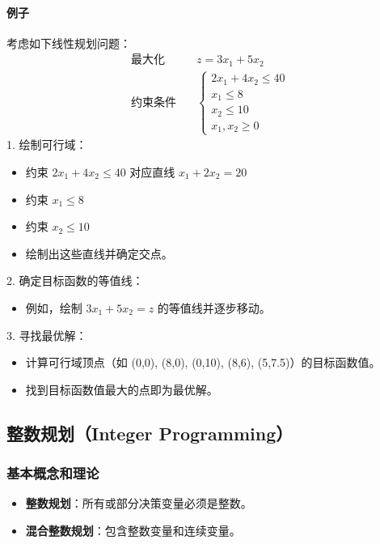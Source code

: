 \documentclass[UTF8]{ctexart}
\begin{document}
\paragraph{例子}
考虑如下线性规划问题：
\[
\begin{aligned}
\text{最大化} & \quad z = 3x_1 + 5x_2 \\
\text{约束条件} & \quad 
\begin{cases}
2x_1 + 4x_2 \leq 40 \\
x_1 \leq 8 \\
x_2 \leq 10 \\
x_1, x_2 \geq 0
\end{cases}
\end{aligned}
\]
1. 绘制可行域：
    \begin{itemize}
        \item 约束 \( 2x_1 + 4x_2 \leq 40 \) 对应直线 \( x_1 + 2x_2 = 20 \)
        \item 约束 \( x_1 \leq 8 \)
        \item 约束 \( x_2 \leq 10 \)
        \item 绘制出这些直线并确定交点。
    \end{itemize}
2. 确定目标函数的等值线：
    \begin{itemize}
        \item 例如，绘制 \( 3x_1 + 5x_2 = z \) 的等值线并逐步移动。
    \end{itemize}
3. 寻找最优解：
    \begin{itemize}
        \item 计算可行域顶点（如 (0,0), (8,0), (0,10), (8,6), (5,7.5)）的目标函数值。
        \item 找到目标函数值最大的点即为最优解。
    \end{itemize}

\subsection {整数规划（Integer Programming）}
\subsubsection {基本概念和理论}
\begin{itemize}
    \item \textbf{整数规划}：所有或部分决策变量必须是整数。
    \item \textbf{混合整数规划}：包含整数变量和连续变量。
\end{itemize}
\end{document}
